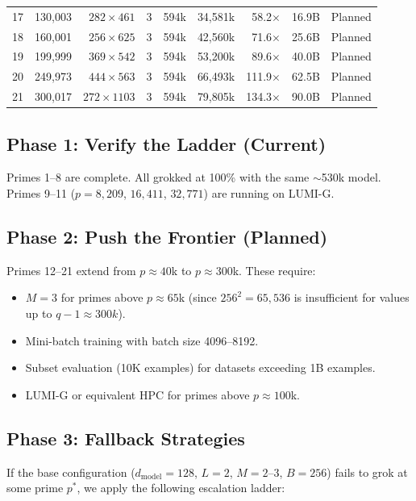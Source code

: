 \documentclass[11pt]{article}
\newcommand{\dmodel}{d_{\mathrm{model}}}
\begin{document}
\begin{table}[t]
\begin{tabular}{rlrrrrrrl}
17 & 130,003 & $282 \times 461$ & 3 & 594k & 34,581k & 58.2$\times$ & 16.9B & Planned \\
18 & 160,001 & $256 \times 625$ & 3 & 594k & 42,560k & 71.6$\times$ & 25.6B & Planned \\
19 & 199,999 & $369 \times 542$ & 3 & 594k & 53,200k & 89.6$\times$ & 40.0B & Planned \\
20 & 249,973 & $444 \times 563$ & 3 & 594k & 66,493k & 111.9$\times$ & 62.5B & Planned \\
21 & 300,017 & $272 \times 1103$ & 3 & 594k & 79,805k & 134.3$\times$ & 90.0B & Planned \\
\bottomrule
\end{tabular}
\end{table}

\subsection{Phase 1: Verify the Ladder (Current)}

Primes 1--8 are complete. All grokked at 100\% with the same $\sim$530k model. Primes 9--11 ($p = 8{,}209$, $16{,}411$, $32{,}771$) are running on LUMI-G.

\subsection{Phase 2: Push the Frontier (Planned)}

Primes 12--21 extend from $p \approx 40$k to $p \approx 300$k. These require:
\begin{itemize}[leftmargin=*]
    \item $M = 3$ for primes above $p \approx 65$k (since $256^2 = 65{,}536$ is insufficient for values up to $q - 1 \approx 300k$).
    \item Mini-batch training with batch size 4096--8192.
    \item Subset evaluation (10K examples) for datasets exceeding 1B examples.
    \item LUMI-G or equivalent HPC for primes above $p \approx 100$k.
\end{itemize}

\subsection{Phase 3: Fallback Strategies}
\label{sec:fallback}

If the base configuration ($\dmodel = 128$, $L = 2$, $M = 2$--$3$, $B = 256$) fails to grok at some prime $p^*$, we apply the following escalation ladder:
\end{document}
